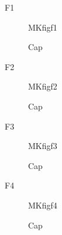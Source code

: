 \documentclass{beamer}
\begin{document}
\begin{frame}{F1}\begin{figure}\centering MKfigf1\caption{Cap}\label{fig:f1}\end{figure}\end{frame}
\begin{frame}{F2}\begin{figure}\centering MKfigf2\caption{Cap}\label{fig:f2}\end{figure}\end{frame}
\begin{frame}{F3}\begin{figure}\centering MKfigf3\caption{Cap}\label{fig:f3}\end{figure}\end{frame}
\begin{frame}{F4}\begin{figure}\centering MKfigf4\caption{Cap}\label{fig:f4}\end{figure}\end{frame}
\end{document}
